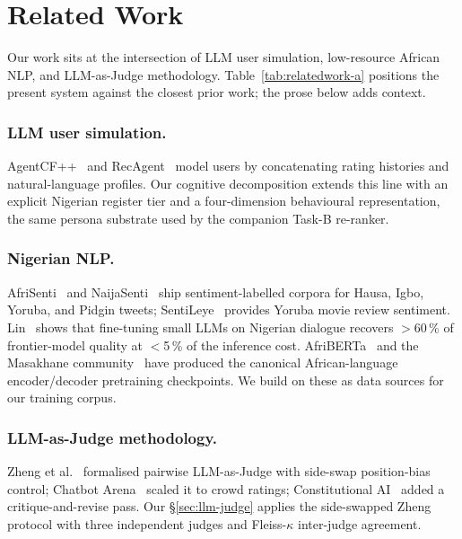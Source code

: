 \documentclass[sigconf,nonacm,balance]{acmart}
\begin{document}
\section{Related Work}

Our work sits at the intersection of LLM user simulation, low-resource
African NLP, and LLM-as-Judge methodology. Table~\ref{tab:relatedwork-a}
positions the present system against the closest prior work; the prose
below adds context.

\subsubsection*{LLM user simulation.} AgentCF++~\cite{agentcf} and
RecAgent~\cite{recagent} model users by concatenating rating histories and
natural-language profiles. Our cognitive decomposition extends this line
with an explicit Nigerian register tier and a four-dimension behavioural
representation, the same persona substrate used by the companion Task-B
re-ranker.

\subsubsection*{Nigerian NLP.}  AfriSenti~\cite{afrisenti} and
NaijaSenti~\cite{naijasenti} ship sentiment-labelled corpora for Hausa,
Igbo, Yoruba, and Pidgin tweets; SentiLeye~\cite{sentileye} provides Yoruba
movie review sentiment.  Lin~\cite{lin2024} shows that fine-tuning small
LLMs on Nigerian dialogue recovers $>$60\,\% of frontier-model quality at
$<$5\,\% of the inference cost. AfriBERTa~\cite{afriberta} and the
Masakhane community~\cite{masakhane} have produced the canonical
African-language encoder/decoder pretraining checkpoints. We build on
these as data sources for our training corpus.

\subsubsection*{LLM-as-Judge methodology.} Zheng et al.~\cite{mtbench}
formalised pairwise LLM-as-Judge with side-swap position-bias control;
Chatbot Arena~\cite{chatbotarena} scaled it to crowd ratings; Constitutional
AI~\cite{constitutionalai} added a critique-and-revise pass. Our §\ref{sec:llm-judge}
applies the side-swapped Zheng protocol with three independent judges and
Fleiss-$\kappa$ inter-judge agreement.
\end{document}
